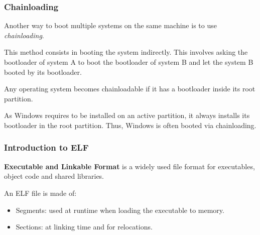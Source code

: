 \begin{frame}
  \frametitle{Chainloading}

  Another way to boot multiple systems on the same machine is to use {\em chainloading}.

  \-

  This method consists in booting the system indirectly. This involves asking the bootloader of system A to boot the bootloader of system B and let the system B booted by its bootloader.

  \-

  Any operating system becomes chainloadable if it has a bootloader inside its root partition.

  \-

  As Windows requires to be installed on an active partition, it always installs its bootloader in the root partition. Thus, Windows is often booted via chainloading.

\end{frame}

%
%


\begin{frame}
  \frametitle{Introduction to ELF}

  \textbf{Executable and Linkable Format} is a widely used file format
  for executables, object code and shared libraries.

  \-

  An ELF file is made of:

  \begin{itemize}
  \item
    Segments: used at runtime when loading the executable to memory.
  \item
    Sections: at linking time and for relocations.
  \end{itemize}

\end{frame}


